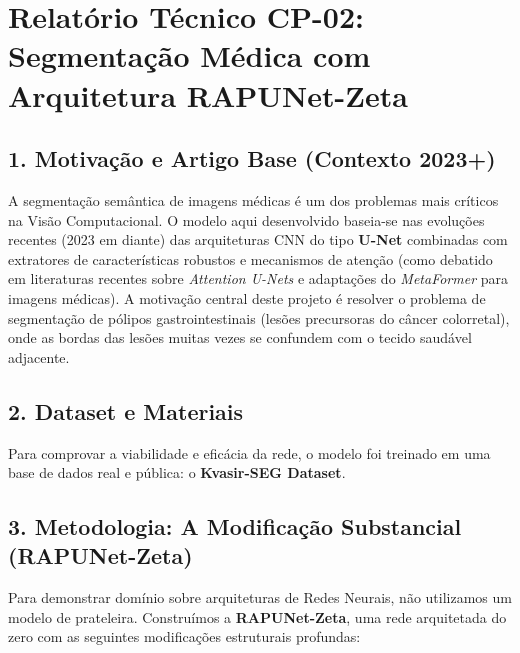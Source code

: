﻿\documentclass{article}
\begin{document}
\section*{Relatório Técnico CP-02: Segmentação Médica com Arquitetura RAPUNet-Zeta}

\subsection*{1. Motivação e Artigo Base (Contexto 2023+)}
A segmentação semântica de imagens médicas é um dos problemas mais críticos na Visão Computacional. O modelo aqui desenvolvido baseia-se nas evoluções recentes (2023 em diante) das arquiteturas CNN do tipo \textbf{U-Net} combinadas com extratores de características robustos e mecanismos de atenção (como debatido em literaturas recentes sobre \textit{Attention U-Nets} e adaptações do \textit{MetaFormer} para imagens médicas). A motivação central deste projeto é resolver o problema de segmentação de pólipos gastrointestinais (lesões precursoras do câncer colorretal), onde as bordas das lesões muitas vezes se confundem com o tecido saudável adjacente.

\subsection*{2. Dataset e Materiais}
Para comprovar a viabilidade e eficácia da rede, o modelo foi treinado em uma base de dados real e pública: o \textbf{Kvasir-SEG Dataset}. 

\subsection*{3. Metodologia: A Modificação Substancial (RAPUNet-Zeta)}
Para demonstrar domínio sobre arquiteturas de Redes Neurais, não utilizamos um modelo de prateleira. Construímos a \textbf{RAPUNet-Zeta}, uma rede arquitetada do zero com as seguintes modificações estruturais profundas:
\end{document}
